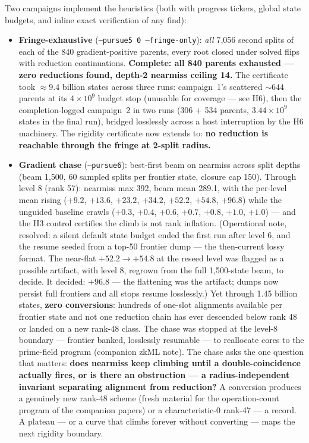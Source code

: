 \documentclass[10pt]{article}
\begin{document}
Two campaigns implement the heuristics (both with progress tickers,
global state budgets, and inline exact verification of any find):
\begin{itemize}
\item \textbf{Fringe-exhaustive} (\texttt{--pursue5 0 --fringe-only}):
  \emph{all} 7{,}056 second splits of each of the 840
  gradient-positive parents, every root closed under solved flips with
  reduction continuations. \textbf{Complete: all 840 parents
  exhausted --- zero reductions found, depth-2 nearmiss ceiling 14.}
  The certificate took ${\approx}9.4$ billion states across three
  runs: campaign~1's scattered ${\sim}644$ parents at its
  $4{\times}10^9$ budget stop (unusable for coverage --- see H6),
  then the completion-logged campaign~2 in two runs (306 + 534
  parents, $3.44{\times}10^9$ states in the final run), bridged
  losslessly across a host interruption by the H6 machinery. The
  rigidity certificate now extends to: \textbf{no reduction is
  reachable through the fringe at 2-split radius.}
\item \textbf{Gradient chase} (\texttt{--pursue6}): best-first beam on
  nearmiss across split depths (beam 1{,}500, 60 sampled splits per
  frontier state, closure cap 150). Through level 8 (rank 57):
  nearmiss max 392, beam mean 289.1, with the per-level mean rising
  ($+9.2$, $+13.6$, $+23.2$, $+34.2$, $+52.2$, $+54.8$, $+96.8$)
  while the unguided baseline crawls ($+0.3$, $+0.4$, $+0.6$,
  $+0.7$, $+0.8$, $+1.0$, $+1.0$) --- and the H3 control certifies
  the climb is not rank inflation. (Operational note, resolved: a
  silent default state budget ended the first run after level 6, and
  the resume seeded from a top-50 frontier dump --- the then-current
  lossy format. The near-flat $+52.2 \to +54.8$ at the reseed level
  was flagged as a possible artifact, with level 8, regrown from the
  full 1{,}500-state beam, to decide. It decided: $+96.8$ --- the
  flattening was the artifact; dumps now persist full frontiers and
  all stops resume losslessly.) Yet through 1.45 billion states,
  \textbf{zero conversions}: hundreds of one-slot alignments
  available per frontier state and not one reduction chain has ever
  descended below rank 48 or landed on a new rank-48 class. The
  chase was stopped at the level-8 boundary --- frontier banked,
  losslessly resumable --- to reallocate cores to the prime-field
  program (companion zkML note). The chase asks
  the one question that matters: \textbf{does nearmiss keep climbing
  until a double-coincidence actually fires, or is there an
  obstruction --- a radius-independent invariant separating alignment
  from reduction?} A conversion produces a genuinely new rank-48
  scheme (fresh material for the operation-count program of the
  companion papers) or a characteristic-0 rank-47 --- a record. A
  plateau --- or a curve that climbs forever without converting ---
  maps the next rigidity boundary.
\end{itemize}
\end{document}

